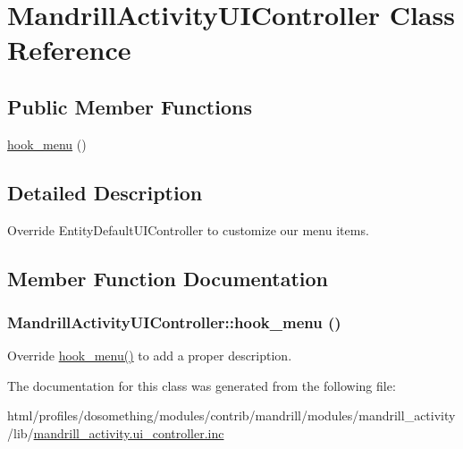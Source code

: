 \hypertarget{classMandrillActivityUIController}{
\section{MandrillActivityUIController Class Reference}
\label{classMandrillActivityUIController}
}
\subsection*{Public Member Functions}
\begin{DoxyCompactItemize}
\item 
\hyperlink{classMandrillActivityUIController_aecde238d4231bffebc0168c0991a1bf5}{hook\_\-menu} ()
\end{DoxyCompactItemize}


\subsection{Detailed Description}
Override EntityDefaultUIController to customize our menu items. 

\subsection{Member Function Documentation}
\hypertarget{classMandrillActivityUIController_aecde238d4231bffebc0168c0991a1bf5}{
\subsubsection[{hook\_\-menu}]{\setlength{\rightskip}{0pt plus 5cm}MandrillActivityUIController::hook\_\-menu ()}}
\label{classMandrillActivityUIController_aecde238d4231bffebc0168c0991a1bf5}
Override \hyperlink{classMandrillActivityUIController_aecde238d4231bffebc0168c0991a1bf5}{hook\_\-menu()} to add a proper description. 

The documentation for this class was generated from the following file:\begin{DoxyCompactItemize}
\item 
html/profiles/dosomething/modules/contrib/mandrill/modules/mandrill\_\-activity/lib/\hyperlink{mandrill__activity_8ui__controller_8inc}{mandrill\_\-activity.ui\_\-controller.inc}\end{DoxyCompactItemize}
